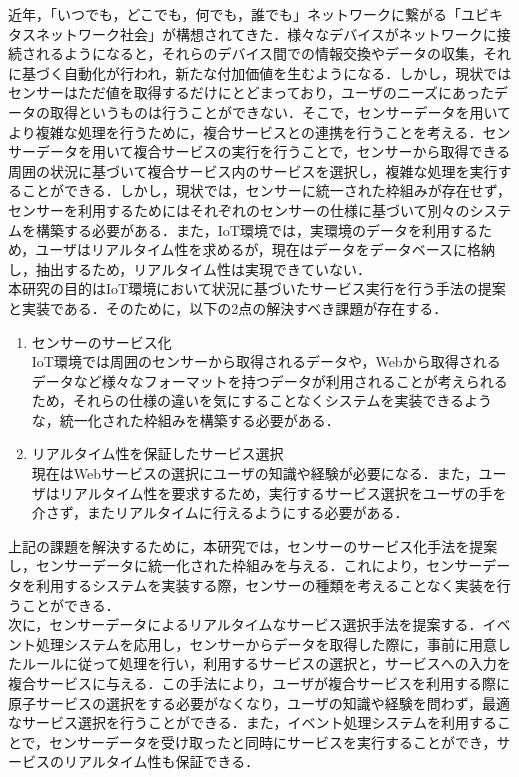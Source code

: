 \documentclass{kuisthesis}			%
\date{平成28年2月6日}				%
\begin{document}
\maketitle					%

\begin{jabstract}				%
近年，「いつでも，どこでも，何でも，誰でも」ネットワークに繋がる「ユビキタスネットワーク社会」が構想されてきた．様々なデバイスがネットワークに接続されるようになると，それらのデバイス間での情報交換やデータの収集，それに基づく自動化が行われ，新たな付加価値を生むようになる．しかし，現状ではセンサーはただ値を取得するだけにとどまっており，ユーザのニーズにあったデータの取得というものは行うことができない．そこで，センサーデータを用いてより複雑な処理を行うために，複合サービスとの連携を行うことを考える．センサーデータを用いて複合サービスの実行を行うことで，センサーから取得できる周囲の状況に基づいて複合サービス内のサービスを選択し，複雑な処理を実行することができる．しかし，現状では，センサーに統一された枠組みが存在せず，センサーを利用するためにはそれぞれのセンサーの仕様に基づいて別々のシステムを構築する必要がある．また，IoT環境では，実環境のデータを利用するため，ユーザはリアルタイム性を求めるが，現在はデータをデータベースに格納し，抽出するため，リアルタイム性は実現できていない．\\
本研究の目的はIoT環境において状況に基づいたサービス実行を行う手法の提案と実装である．そのために，以下の2点の解決すべき課題が存在する．
\begin{enumerate}
\item センサーのサービス化\\
IoT環境では周囲のセンサーから取得されるデータや，Webから取得されるデータなど様々なフォーマットを持つデータが利用されることが考えられるため，それらの仕様の違いを気にすることなくシステムを実装できるような，統一化された枠組みを構築する必要がある．
\item リアルタイム性を保証したサービス選択\\
現在はWebサービスの選択にユーザの知識や経験が必要になる．また，ユーザはリアルタイム性を要求するため，実行するサービス選択をユーザの手を介さず，またリアルタイムに行えるようにする必要がある．
\end{enumerate}
上記の課題を解決するために，本研究では，センサーのサービス化手法を提案し，センサーデータに統一化された枠組みを与える．これにより，センサーデータを利用するシステムを実装する際，センサーの種類を考えることなく実装を行うことができる．\\
次に，センサーデータによるリアルタイムなサービス選択手法を提案する．イベント処理システムを応用し，センサーからデータを取得した際に，事前に用意したルールに従って処理を行い，利用するサービスの選択と，サービスへの入力を複合サービスに与える．この手法により，ユーザが複合サービスを利用する際に原子サービスの選択をする必要がなくなり，ユーザの知識や経験を問わず，最適なサービス選択を行うことができる．また，イベント処理システムを利用することで，センサーデータを受け取ったと同時にサービスを実行することができ，サービスのリアルタイム性も保証できる．\\

\end{jabstract}
\end{document}
